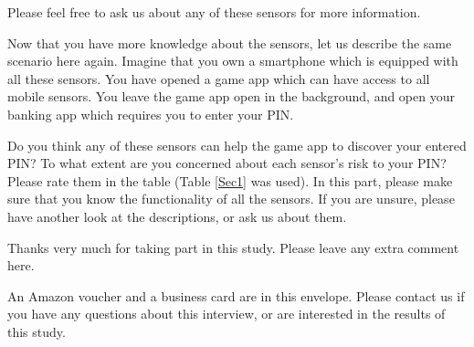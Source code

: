 \documentclass[10pt,twocolumn]{article}
\begin{document}
\noindent 
Please feel free to ask us about any of these sensors for more information. 


Now that you have more knowledge about the sensors, let us describe the same scenario here again.  Imagine that you own a smartphone which is equipped with all these sensors. You have opened a game app which can have access to all mobile sensors. 
You leave the game app open in the background, and open your banking app which requires you to enter your PIN. 

Do you think any of these sensors can help the game app to discover your entered PIN? To what extent are you concerned about each sensor's risk to your PIN? Please rate them in the table (Table \ref{Sec1} was used).
In this part, please make sure that you know the functionality of all the sensors. If you are unsure, please have another look at the descriptions, or ask us about them. 

Thanks very much for taking part in this study. Please leave any extra comment here.

An Amazon voucher and a business card are in this envelope. Please contact us if you have any questions about this interview, or are interested in the results of this study. 
\end{document}
